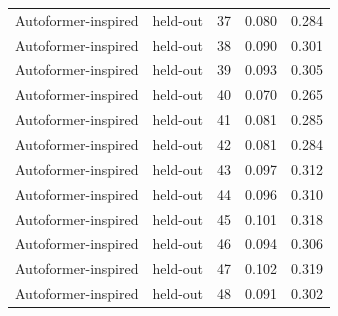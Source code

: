 \begin{tabular}{llrrr}
Autoformer-inspired & held-out & 37 & 0.080 & 0.284 \\
Autoformer-inspired & held-out & 38 & 0.090 & 0.301 \\
Autoformer-inspired & held-out & 39 & 0.093 & 0.305 \\
Autoformer-inspired & held-out & 40 & 0.070 & 0.265 \\
Autoformer-inspired & held-out & 41 & 0.081 & 0.285 \\
Autoformer-inspired & held-out & 42 & 0.081 & 0.284 \\
Autoformer-inspired & held-out & 43 & 0.097 & 0.312 \\
Autoformer-inspired & held-out & 44 & 0.096 & 0.310 \\
Autoformer-inspired & held-out & 45 & 0.101 & 0.318 \\
Autoformer-inspired & held-out & 46 & 0.094 & 0.306 \\
Autoformer-inspired & held-out & 47 & 0.102 & 0.319 \\
Autoformer-inspired & held-out & 48 & 0.091 & 0.302 \\
\bottomrule
\end{tabular}
